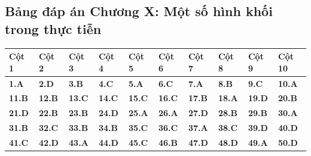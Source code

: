 \documentclass[11pt,a4paper]{article}
\begin{document}
\subsection*{\color{primary} Bảng đáp án Chương X: Một số hình khối trong thực tiễn}
\begin{center}
\renewcommand{\arraystretch}{1.25}
\begin{tabularx}{\textwidth}{*{10}{>{\centering\arraybackslash}X}}
\toprule
\textbf{\color{primary} Cột 1} & \textbf{\color{primary} Cột 2} & \textbf{\color{primary} Cột 3} & \textbf{\color{primary} Cột 4} & \textbf{\color{primary} Cột 5} & \textbf{\color{primary} Cột 6} & \textbf{\color{primary} Cột 7} & \textbf{\color{primary} Cột 8} & \textbf{\color{primary} Cột 9} & \textbf{\color{primary} Cột 10} \\
\midrule
\textbf{1.A} & \textbf{2.D} & \textbf{3.B} & \textbf{4.C} & \textbf{5.A} & \textbf{6.C} & \textbf{7.A} & \textbf{8.B} & \textbf{9.C} & \textbf{10.A} \\
\rowcolor{rowtint} \textbf{11.B} & \textbf{12.B} & \textbf{13.C} & \textbf{14.C} & \textbf{15.C} & \textbf{16.C} & \textbf{17.B} & \textbf{18.A} & \textbf{19.D} & \textbf{20.B} \\
\textbf{21.D} & \textbf{22.B} & \textbf{23.B} & \textbf{24.D} & \textbf{25.A} & \textbf{26.A} & \textbf{27.D} & \textbf{28.B} & \textbf{29.B} & \textbf{30.A} \\
\rowcolor{rowtint} \textbf{31.B} & \textbf{32.C} & \textbf{33.B} & \textbf{34.B} & \textbf{35.C} & \textbf{36.C} & \textbf{37.A} & \textbf{38.C} & \textbf{39.D} & \textbf{40.D} \\
\textbf{41.C} & \textbf{42.D} & \textbf{43.A} & \textbf{44.D} & \textbf{45.C} & \textbf{46.B} & \textbf{47.D} & \textbf{48.D} & \textbf{49.A} & \textbf{50.D} \\
\bottomrule
\end{tabularx}
\end{center}\vspace{10pt}
\end{document}
